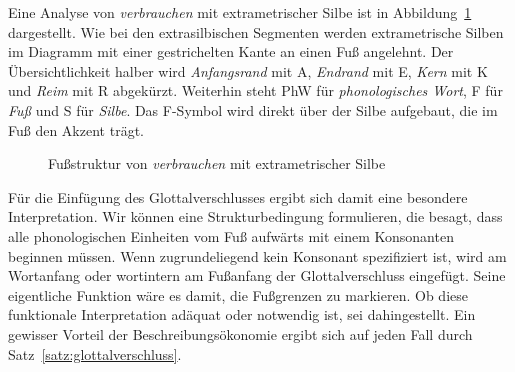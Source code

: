Eine Analyse von \textit{verbrauchen} mit extrametrischer Silbe ist in Abbildung~\ref{fig:verbrauchen} dargestellt.
Wie bei den extrasilbischen Segmenten werden extrametrische Silben im Diagramm mit einer gestrichelten Kante an einen Fuß angelehnt.
Der Übersichtlichkeit halber wird \textit{Anfangsrand} mit A, \textit{Endrand} mit E, \textit{Kern} mit K und \textit{Reim} mit R abgekürzt.
Weiterhin steht PhW für \textit{phonologisches Wort}, F für \textit{Fuß} und S für \textit{Silbe}.
Das F-Symbol wird direkt über der Silbe aufgebaut, die im Fuß den Akzent trägt.

\begin{figure}[!htbp]
	\centering
	\label{fig:verbrauchen}
	\caption{Fußstruktur von \textit{verbrauchen} mit extrametrischer Silbe}
\end{figure}

Für die Einfügung des Glottalverschlusses ergibt sich damit eine besondere Interpretation.
Wir können eine Strukturbedingung formulieren, die besagt, dass alle phonologischen Einheiten vom Fuß aufwärts mit einem Konsonanten beginnen müssen.
Wenn zugrundeliegend kein Konsonant spezifiziert ist, wird am Wortanfang oder wortintern am Fußanfang der Glottalverschluss eingefügt.
Seine eigentliche Funktion wäre es damit, die Fußgrenzen zu markieren.
Ob diese funktionale Interpretation adäquat oder notwendig ist, sei dahingestellt.
Ein gewisser Vorteil der Beschreibungsökonomie ergibt sich auf jeden Fall durch Satz~\ref{satz:glottalverschluss}.


